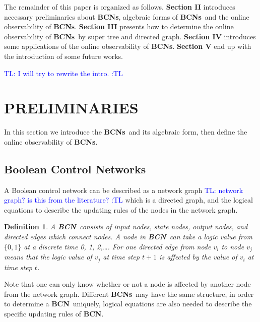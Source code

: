 \documentclass[letterpaper, 10 pt, conference]{ieeeconf}  %
\newtheorem{definition}{Definition}
\def \BCN {{\bf BCN}}
\def \BCNs {{\bf BCNs}}
\newcommand{\tl}[1]{\textcolor{blue} {TL: #1 :TL} }
\begin{document}
The remainder of this paper is organized as follows. {\bf Section II} introduces necessary preliminaries about {\bf BCNs}, algebraic forms of \BCNs\ and the online observability of {\bf BCNs}. {\bf Section III} presents how to determine the online observability of \BCNs\ by super tree and directed graph. {\bf Section IV} introduces some applications of the online observability of {\bf BCNs}. {\bf Section V} end up  with the introduction of some future works.

\tl{I will try to rewrite the intro.}

\section{PRELIMINARIES}
In this section we introduce the \BCNs\ and its algebraic form, then define the online observability of {\bf BCNs}.



\subsection{Boolean Control Networks}

A Boolean control network can be described as a network graph \tl{network graph? is this from the literature?} which is a directed graph, and the logical equations to describe the updating rules of the nodes in the network graph. 

\begin{definition}
A \BCN\ consists of input nodes, state nodes, output nodes, and directed edges which connect nodes. A node in \BCN\ can take a logic value from $\{0,1\}$ at a discrete time 0, 1, 2,\ldots. For one directed edge from node $v_i$ to node $v_j$ means that the logic value of $v_j$ at time step $t+1$ is affected by the value of $v_i$ at time step $t$. 
\end{definition}


Note that one can only know whether or not a node is affected by another node from the network graph. Different \BCNs\ may have the same structure, in order to determine a \BCN\ uniquely, logical equations are also needed to describe the specific updating rules of {\bf BCN}.
\end{document}
